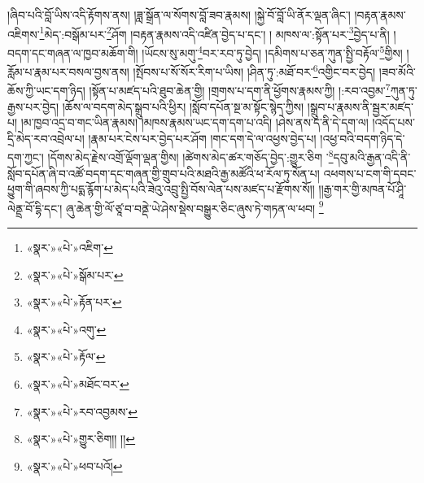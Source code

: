 །ཞིབ་པའི་བློ་ཡིས་འདི་རྟོགས་ནས། །ཟླ་སྒྲོན་ལ་སོགས་བློ་ཟབ་རྣམས། །སྐྱེ་བོ་བློ་ཡི་ནོར་ལྡན་ཞིང་། །བརྟན་རྣམས་འཇིགས་\footnote{«སྣར་»«པེ་»འཇིག་}མེད་:བསྒོམ་པར་\footnote{«སྣར་»«པེ་»སྒོམ་པར་}ཤོག །བརྟན་རྣམས་འདི་འཛིན་བྱེད་པ་དང་། །
མཁས་ལ་:སྟོན་པར་\footnote{«སྣར་»«པེ་»རྟོན་པར་}བྱེད་པ་ནི། །བདག་དང་གཞན་ལ་ཁྱབ་མཆོག་གི། །ཡོངས་སུ་མགུ་\footnote{«སྣར་»«པེ་»འགུ་}བར་རབ་ཏུ་བྱེད། །དམིགས་པ་ཅན་ཀུན་སྤྱི་བརྟོལ་\footnote{«སྣར་»«པེ་»རྟོལ་}གྱིས། །རློམ་པ་རྣམ་པར་བསལ་བྱས་ནས། །སྤོབས་པ་སོ་སོར་རིག་པ་ཡིས། །ཤིན་ཏུ་:མཐོ་བར་\footnote{«སྣར་»«པེ་»མཐོང་བར་}འགྱིང་བར་བྱེད། །ཟབ་མོའི་ཆོས་ཀྱི་ཡང་དག་ཉིད། །སྟོན་པ་མཛད་པའི་ཐུབ་ཆེན་གྱི། །གྲགས་པ་དག་ནི་ཕྱོགས་རྣམས་ཀྱི། །:རབ་འབྱམ་\footnote{«སྣར་»«པེ་»རབ་འབྱམས་}ཀུན་ཏུ་རྒྱས་པར་བྱེད། །ཆོས་ལ་བདག་མེད་སྒྲུབ་པའི་ཕྱིར། །སློབ་དཔོན་སྔ་མ་སྟོང་སྙེད་ཀྱིས། །སྒྲུབ་པ་རྣམས་ནི་སྦྱར་མཛད་པ། །མ་ཁྱབ་འདྲ་བ་གང་ཡིན་རྣམས། །མཁས་རྣམས་ཡང་དག་དག་པ་འདི། །ཤེས་ནས་ད་ནི་དེ་དག་ལ། །འདོད་པས་དྲི་མེད་རབ་འབྲེལ་པ། །རྣམ་པར་ངེས་པར་བྱེད་པར་ཤོག །གང་དག་དེ་ལ་འཕྱས་བྱེད་པ། །འཕྱ་བའི་བདག་ཉིད་དེ་དག་ཀྱང་། །དོགས་མེད་རྗེས་འགྲོ་ལྡོག་ལྡན་གྱིས། །ཚེགས་མེད་ཚར་གཅོད་བྱེད་:གྱུར་ཅིག ་\footnote{«སྣར་»«པེ་»གྱུར་ཅིག།། །།}དབུ་མའི་རྒྱན་འདི་ནི་སློབ་དཔོན་ཞི་བ་འཚོ་བདག་དང་གཞན་གྱི་གྲུབ་པའི་མཐའི་རྒྱ་མཚོའི་ཕ་རོལ་ཏུ་སོན་པ། འཕགས་པ་ངག་གི་དབང་ཕྱུག་གི་ཞབས་ཀྱི་པདྨ་རྙོག་པ་མེད་པའི་ཟེའུ་འབྲུ་སྤྱི་བོས་ལེན་པས་མཛད་པ་རྫོགས་སོ།། །།རྒྱ་གར་གྱི་མཁན་པོ་ཤཱི་ལེནྡྲ་བོ་དྷི་དང་། ཞུ་ཆེན་གྱི་ལོ་ཙཱ་བ་བནྡེ་ཡེ་ཤེས་སྡེས་བསྒྱུར་ཅིང་ཞུས་ཏེ་གཏན་ལ་ཕབ། \footnote{«སྣར་»«པེ་»ཕབ་པའོ། }